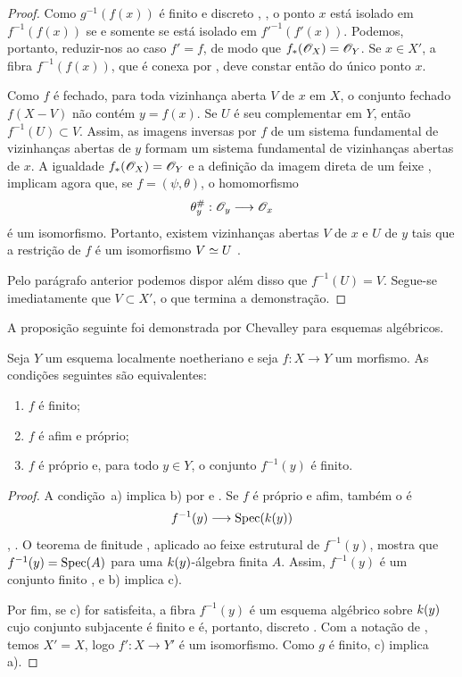 \begin{proof}
Como $g^{-1}(f(x))$ é finito e discreto
, , o ponto $x$ está isolado em
$f^{-1}(f(x))$ se e somente se está isolado em
$f'^{-1}(f'(x))$. Podemos, portanto, reduzir-nos ao caso $f'=f$, de
modo que $f_*(\mathscr{O}_X)=\mathscr{O}_Y$. Se $x\in X'$, a fibra
$f^{-1}(f(x))$, que é conexa por , deve constar
então do único ponto $x$.

Como $f$ é fechado, para toda vizinhança aberta $V$ de $x$ em $X$, o
conjunto fechado $f(X-V)$ não contém $y=f(x)$. Se $U$ é seu
complementar em $Y$, então $f^{-1}(U)\subset V$. Assim, as
imagens inversas por $f$ de um sistema fundamental de vizinhanças
abertas de $y$ formam um sistema fundamental de vizinhanças abertas de
$x$. A igualdade $f_*(\mathscr{O}_X)=\mathscr{O}_Y$ e a definição da
imagem direta de um feixe ,  implicam
agora que, se $f=(\psi,\theta)$, o homomorfismo
\[
  \theta_y^\#:\mathscr{O}_y\longrightarrow\mathscr{O}_x
\]
é um isomorfismo. Portanto, existem vizinhanças abertas $V$ de $x$ e
$U$ de $y$ tais que a restrição de $f$ é um isomorfismo
$V\simeq U$ .


Pelo parágrafo anterior podemos dispor além disso que
$f^{-1}(U)=V$. Segue-se imediatamente que $V\subset X'$, o que
termina a demonstração.
\end{proof}

A proposição seguinte foi demonstrada por Chevalley para esquemas
algébricos.

\begin{proposition}[4.4.2]
\label{III.4.4.2}
Seja $Y$ um esquema localmente noetheriano e seja $f:X\to Y$ um
morfismo. As condições seguintes são equivalentes:
\begin{enumerate}
  \item[{\rm a)}] $f$ é finito;
  \item[{\rm b)}] $f$ é afim e próprio;
  \item[{\rm c)}] $f$ é próprio e, para todo $y\in Y$, o conjunto
    $f^{-1}(y)$ é finito.
\end{enumerate}
\end{proposition}

\begin{proof}
A condição~a) implica b) por  e
. Se $f$ é próprio e afim, também o é
\[
  f^{-1}(y)\longrightarrow\operatorname{Spec}(k(y))
\]
, . O teorema de finitude
, aplicado ao feixe estrutural de $f^{-1}(y)$, mostra
que $f^{-1}(y)=\operatorname{Spec}(A)$ para uma $k(y)$-álgebra finita $A$. Assim,
$f^{-1}(y)$ é um conjunto finito , e b) implica
c).

Por fim, se c) for satisfeita, a fibra $f^{-1}(y)$ é um esquema
algébrico sobre $k(y)$ cujo conjunto subjacente é finito e é,
portanto, discreto . Com a notação de
, temos $X'=X$, logo
$f':X\to Y'$ é um isomorfismo. Como $g$ é finito, c) implica a).
\end{proof}

